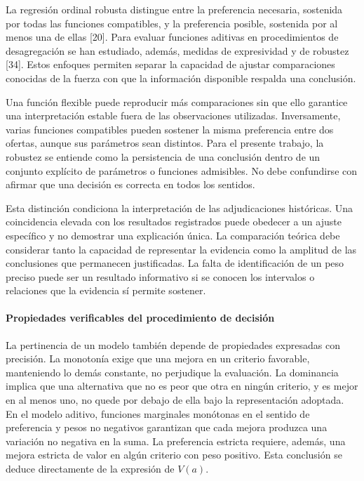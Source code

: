 \documentclass[12pt,a4paper]{article}
\begin{document}
La regresión ordinal robusta distingue entre la preferencia necesaria, sostenida por todas las funciones compatibles, y la preferencia posible, sostenida por al menos una de ellas [20]. Para evaluar funciones aditivas en procedimientos de desagregación se han estudiado, además, medidas de expresividad y de robustez [34]. Estos enfoques permiten separar la capacidad de ajustar comparaciones conocidas de la fuerza con que la información disponible respalda una conclusión.

Una función flexible puede reproducir más comparaciones sin que ello garantice una interpretación estable fuera de las observaciones utilizadas. Inversamente, varias funciones compatibles pueden sostener la misma preferencia entre dos ofertas, aunque sus parámetros sean distintos. Para el presente trabajo, la robustez se entiende como la persistencia de una conclusión dentro de un conjunto explícito de parámetros o funciones admisibles. No debe confundirse con afirmar que una decisión es correcta en todos los sentidos.

Esta distinción condiciona la interpretación de las adjudicaciones históricas. Una coincidencia elevada con los resultados registrados puede obedecer a un ajuste específico y no demostrar una explicación única. La comparación teórica debe considerar tanto la capacidad de representar la evidencia como la amplitud de las conclusiones que permanecen justificadas. La falta de identificación de un peso preciso puede ser un resultado informativo si se conocen los intervalos o relaciones que la evidencia sí permite sostener.

\paragraph{Propiedades verificables del procedimiento de decisión}

La pertinencia de un modelo también depende de propiedades expresadas con precisión. La monotonía exige que una mejora en un criterio favorable, manteniendo lo demás constante, no perjudique la evaluación. La dominancia implica que una alternativa que no es peor que otra en ningún criterio, y es mejor en al menos uno, no quede por debajo de ella bajo la representación adoptada. En el modelo aditivo, funciones marginales monótonas en el sentido de preferencia y pesos no negativos garantizan que cada mejora produzca una variación no negativa en la suma. La preferencia estricta requiere, además, una mejora estricta de valor en algún criterio con peso positivo. Esta conclusión se deduce directamente de la expresión de $V(a)$.
\end{document}
